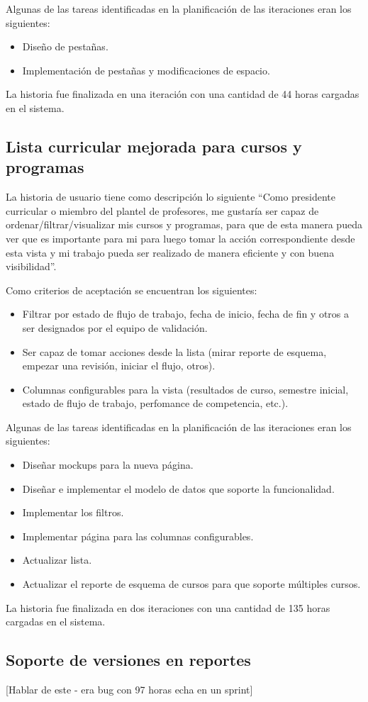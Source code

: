 Algunas de las tareas identificadas en la planificación de las iteraciones eran los siguientes:
\begin{itemize}
	\item Diseño de pestañas.
	\item Implementación de pestañas y modificaciones de espacio.
\end{itemize}

La historia fue finalizada en una iteración con una cantidad de 44 horas cargadas en el sistema.


\subsection{Lista curricular mejorada para cursos y programas}
La historia de usuario tiene como descripción lo siguiente \enquote{Como presidente curricular o miembro del plantel de profesores, me gustaría ser capaz de ordenar/filtrar/visualizar mis cursos y programas, para que de esta manera pueda ver que es importante para mi para luego tomar la acción correspondiente desde esta vista y mi trabajo pueda ser realizado de manera eficiente y con buena visibilidad}.

Como criterios de aceptación se encuentran los siguientes:
\begin{itemize}
	\item Filtrar por estado de flujo de trabajo, fecha de inicio, fecha de fin y otros a ser designados por el equipo de validación.
	\item Ser capaz de tomar acciones desde la lista (mirar reporte de esquema, empezar una revisión, iniciar el flujo, otros).
	\item Columnas configurables para la vista (resultados de curso, semestre inicial, estado de flujo de trabajo, perfomance de competencia, etc.).
\end{itemize}

Algunas de las tareas identificadas en la planificación de las iteraciones eran los siguientes:
\begin{itemize}
	\item Diseñar mockups para la nueva página.
	\item Diseñar e implementar el modelo de datos que soporte la funcionalidad.
	\item Implementar los filtros.
	\item Implementar página para las columnas configurables.
	\item Actualizar lista.
	\item Actualizar el reporte de esquema de cursos para que soporte múltiples cursos.
\end{itemize}

La historia fue finalizada en dos iteraciones con una cantidad de 135 horas cargadas en el sistema.

\subsection{Soporte de versiones en reportes}
[Hablar de este - era bug con 97 horas echa en un sprint]